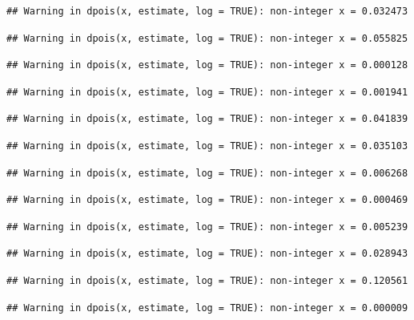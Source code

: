 \documentclass[]{article}
\begin{document}
\begin{verbatim}
## Warning in dpois(x, estimate, log = TRUE): non-integer x = 0.032473
\end{verbatim}

\begin{verbatim}
## Warning in dpois(x, estimate, log = TRUE): non-integer x = 0.055825
\end{verbatim}

\begin{verbatim}
## Warning in dpois(x, estimate, log = TRUE): non-integer x = 0.000128
\end{verbatim}

\begin{verbatim}
## Warning in dpois(x, estimate, log = TRUE): non-integer x = 0.001941
\end{verbatim}

\begin{verbatim}
## Warning in dpois(x, estimate, log = TRUE): non-integer x = 0.041839
\end{verbatim}

\begin{verbatim}
## Warning in dpois(x, estimate, log = TRUE): non-integer x = 0.035103
\end{verbatim}

\begin{verbatim}
## Warning in dpois(x, estimate, log = TRUE): non-integer x = 0.006268
\end{verbatim}

\begin{verbatim}
## Warning in dpois(x, estimate, log = TRUE): non-integer x = 0.000469
\end{verbatim}

\begin{verbatim}
## Warning in dpois(x, estimate, log = TRUE): non-integer x = 0.005239
\end{verbatim}

\begin{verbatim}
## Warning in dpois(x, estimate, log = TRUE): non-integer x = 0.028943
\end{verbatim}

\begin{verbatim}
## Warning in dpois(x, estimate, log = TRUE): non-integer x = 0.120561
\end{verbatim}

\begin{verbatim}
## Warning in dpois(x, estimate, log = TRUE): non-integer x = 0.000009
\end{verbatim}
\end{document}
